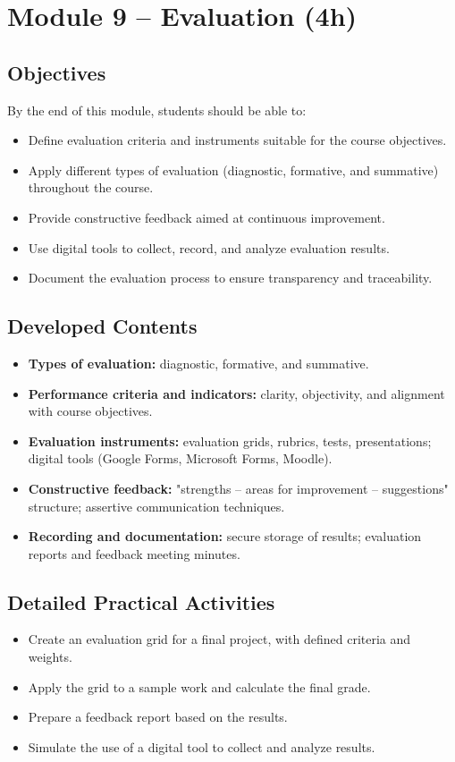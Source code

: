 \section{\textcolor{sectionred}{Module 9 – Evaluation (4h)}}

\subsection{\textcolor{subsectionblue}{Objectives}}
By the end of this module, students should be able to:
\begin{itemize}
  \item Define evaluation criteria and instruments suitable for the course objectives.
  \item Apply different types of evaluation (diagnostic, formative, and summative) throughout the course.
  \item Provide constructive feedback aimed at continuous improvement.
  \item Use digital tools to collect, record, and analyze evaluation results.
  \item Document the evaluation process to ensure transparency and traceability.
\end{itemize}

\subsection{\textcolor{subsectionblue}{Developed Contents}}
\begin{itemize}
  \item \textbf{Types of evaluation:} diagnostic, formative, and summative.
  \item \textbf{Performance criteria and indicators:} clarity, objectivity, and alignment with course objectives.
  \item \textbf{Evaluation instruments:} evaluation grids, rubrics, tests, presentations; digital tools (Google Forms, Microsoft Forms, Moodle).
  \item \textbf{Constructive feedback:} "strengths – areas for improvement – suggestions" structure; assertive communication techniques.
  \item \textbf{Recording and documentation:} secure storage of results; evaluation reports and feedback meeting minutes.
\end{itemize}

\subsection{\textcolor{subsectionblue}{Detailed Practical Activities}}
\begin{itemize}
  \item Create an evaluation grid for a final project, with defined criteria and weights.
  \item Apply the grid to a sample work and calculate the final grade.
  \item Prepare a feedback report based on the results.
  \item Simulate the use of a digital tool to collect and analyze results.
\end{itemize}

